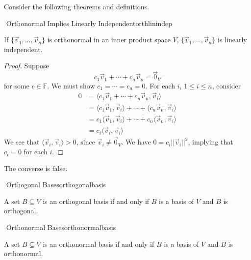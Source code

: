         Consider the following theorems and definitions.
        \begin{theorem}{\Stop\,\,Orthonormal Implies Linearly Independent}{orthlinindep}
            
            If \(\{\vec{v}_1,\ldots,\vec{v}_n\}\) is orthonormal in an inner product space \(V\), \(\{\vec{v}_1,\ldots,\vec{v}_n\}\) is linearly independent.
            \begin{proof}
                Suppose
                \begin{equation*}
                    c_1\vec{v}_1+\cdots+c_n\vec{v}_n=\vec{0}_V
                \end{equation*}
                for some \(c\in\mathbb{F}\). We must show \(c_1=\cdots=c_n=0\). For each \(i\), \(1\leq i\leq n\), consider 
                \begin{align*}
                    0&=\langle c_1\vec{v}_1+\cdots+c_n\vec{v}_n,\vec{v}_i \rangle \\
                    &=\langle c_1\vec{v}_1,\vec{v}_i\rangle+\cdots+\langle c_n\vec{v}_n,\vec{v}_i\rangle \\
                    &=c_1\langle \vec{v}_1,\vec{v}_i\rangle+\cdots+c_n\langle \vec{v}_n,\vec{v}_i\rangle \\
                    &=c_i\langle \vec{v}_i,\vec{v}_i\rangle
                \end{align*}
                We see that \(\langle\vec{v}_i,\vec{v}_i\rangle>0\), since \(\vec{v}_i\neq\vec{0}_V\). We have \(0=c_i||\vec{v}_i||^2\), implying that \(c_i=0\) for each \(i\).
            \end{proof}
            The converse is false.

        \end{theorem}
        \begin{definition}{\Stop\,\,Orthogonal Bases}{orthogonalbasis}

            A set \(B\subseteq V\) is an orthogonal basis if and only if \(B\) is a basis of \(V\) and \(B\) is orthogonal.
            
        \end{definition}
        \begin{definition}{\Stop\,\,Orthonormal Bases}{orthonormalbasis}

            A set \(B\subseteq V\) is an orthonormal basis if and only if \(B\) is a basis of \(V\) and \(B\) is orthonormal.
            
        \end{definition}
